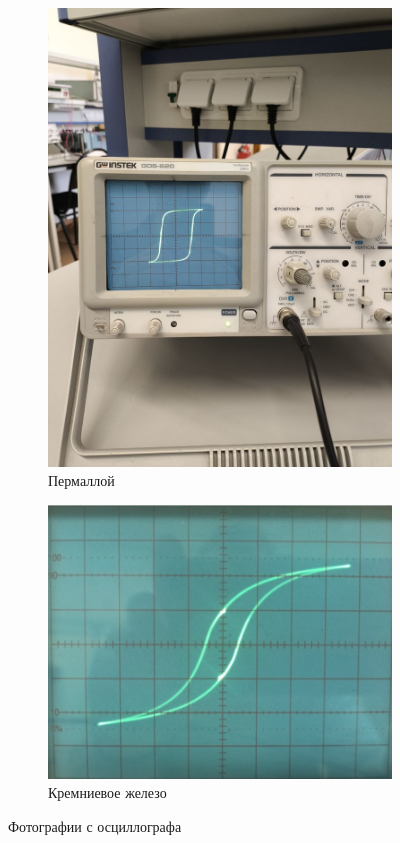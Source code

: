 \documentclass[a4paper]{article}
\begin{document}
\begin{figure}[htbp]
\begin{subfigure}[b]{0.3\textwidth}
    \includegraphics[width=\linewidth]{p4.jpg}
    \caption{Пермаллой} 
    \label{fig:image2}
\end{subfigure}
\hfill
\begin{subfigure}[b]{0.3\textwidth}
    \includegraphics[width=\linewidth]{p6.PNG}
    \caption{Кремниевое железо} 
    \label{fig:image3}
\end{subfigure}
    
\caption{Фотографии с осциллографа} 
\label{fig:three_images}

\end{figure}
\end{document}
